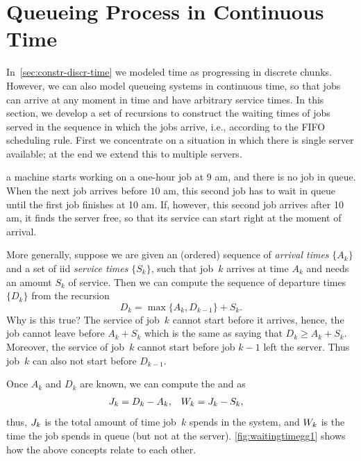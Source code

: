 \documentclass[queueing-book.tex]{subfiles}
\begin{document}
\section{Queueing Process in Continuous Time}
\label{sec:constr-gg1-queu}

In~\cref{sec:constr-discr-time} we modeled time as progressing in discrete chunks.
However, we can also model queueing systems in continuous time, so that jobs can arrive at any moment in time and have arbitrary service times.
In this section, we develop a set of recursions to construct the waiting times of jobs served in the sequence in which the jobs arrive, i.e., according to the FIFO scheduling rule.
First we concentrate on a situation in which there is single server available; at the end we extend this to multiple servers.


 a machine starts working on a one-hour job at 9 am, and there is no job in queue.
When the next job arrives before $10$ am, this second job has to wait in queue until the first job finishes at 10 am.
If, however, this second job arrives after 10 am, it finds the server free, so that its service can start right at the moment of arrival.

More generally, suppose we are given an (ordered) sequence of \emph{arrival times} $\{A_{k}\}$ and a set of iid \emph{service times} $\{S_{k}\}$, such that job~$k$ arrives at time $A_{k}$ and needs an amount $S_{k}$ of service.
Then we can compute the sequence of departure times $\{D_{k}\}$ from the recursion
\begin{equation}\label{eq:qc-3}
D_k = \max\{A_k, D_{k-1}\} + S_k.
\end{equation}
Why is this true?
The service of job~$k$ cannot start before it arrives, hence, the job cannot leave before $A_k + S_k$ which is the same as saying that $D_k \geq A_k +S_k$.
Moreover, the service of job~$k$ cannot start before job $k-1$ left the server. Thus job~$k$ can also not start before $D_{k-1}$.

Once $A_{k}$ and $D_{k}$ are known, we can compute the  and  as
\begin{align*}
J_k &= D_{k} - A_k, &   &  W_k = J_k - S_k,
 \end{align*}
thus, $J_{k}$ is the total amount of time job~$k$ spends in the system, and $W_{k}$ is the time the job spends in queue (but not at the server).  \cref{fig:waitingtimegg1} shows how the above concepts relate to each other.
\end{document}
